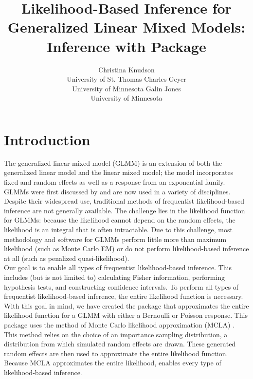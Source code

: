 \documentclass[article]{jss}
\author{Christina Knudson\\ University of St. Thomas \And 
        Charles Geyer\\University of Minnesota \And 
        Galin Jones\\University of Minnesota}
\title{ Likelihood-Based Inference for Generalized Linear Mixed Models: Inference with Package \pkg{glmm}}
\begin{document}

\section{Introduction}
The generalized linear mixed model (GLMM) is an extension of both the generalized linear model and the linear mixed model; the model incorporates  fixed and random effects as well as a response from an exponential family.   GLMMs were first discussed by \citet{stiratelli:laird:ware:1984} and are now  used in a variety of disciplines. Despite their widespread use, traditional methods of frequentist likelihood-based inference are not generally available. The challenge lies in the likelihood function for GLMMs: because the likelihood cannot depend on the random effects, the likelihood is an  integral that is often intractable. Due to this challenge, most methodology and software for  GLMMs perform little more than maximum likelihood (such as Monte Carlo EM)  or do not perform likelihood-based inference at all (such as penalized quasi-likelihood). \\

Our goal is to enable all types of frequentist likelihood-based inference. This includes (but is not limited to) calculating Fisher information, performing hypothesis tests, and constructing confidence intervals.  To perform all types of frequentist likelihood-based inference, the entire likelihood function is necessary.\\


With this goal in mind, we have created the   package  \citep{glmm:package} that approximates the entire likelihood function for a GLMM with either a Bernoulli or Poisson response. This package uses  the method of
 Monte Carlo likelihood approximation (MCLA) \citep{geyer:1994, geyer:thom:1992,  sung:geyer:2007}. 
This method relies on the  choice of an importance sampling distribution,  a distribution from which simulated random effects are drawn. These generated random effects are then used to approximate the entire likelihood function. 
Because MCLA approximates the entire likelihood,   enables  every type of likelihood-based inference. \\

\end{document}
